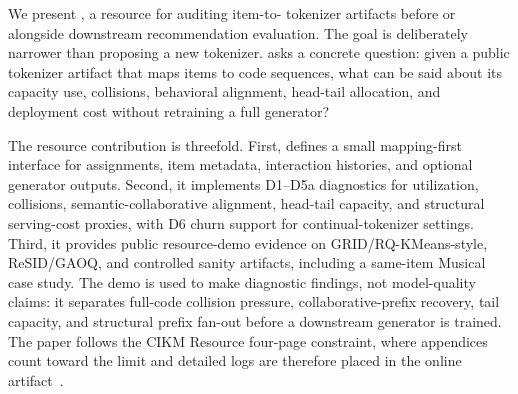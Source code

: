 We present \tool, a resource for auditing item-to-\sid{} tokenizer artifacts
before or alongside downstream recommendation evaluation. The goal is
deliberately narrower than proposing a new tokenizer. \tool asks a concrete
question: given a public tokenizer artifact that maps items to code sequences,
what can be said about its capacity use, collisions, behavioral alignment,
head-tail allocation, and deployment cost without retraining a full generator?

The resource contribution is threefold. First, \tool defines a small
mapping-first interface for \sid assignments, item metadata, interaction
histories, and optional generator outputs. Second, it implements D1--D5a
diagnostics for utilization, collisions, semantic-collaborative alignment,
head-tail capacity, and structural serving-cost proxies, with D6 churn support
for continual-tokenizer settings. Third, it provides public resource-demo
evidence on GRID/RQ-KMeans-style, ReSID/GAOQ, and controlled sanity artifacts,
including a same-item Musical case study. The demo is used to make diagnostic
findings, not model-quality claims: it separates full-code collision pressure,
collaborative-prefix recovery, tail capacity, and structural prefix fan-out
before a downstream generator is trained. The paper follows the CIKM Resource
four-page constraint, where appendices count toward the limit and detailed logs
are therefore placed in the online artifact~\cite{cikm2026resource}.
